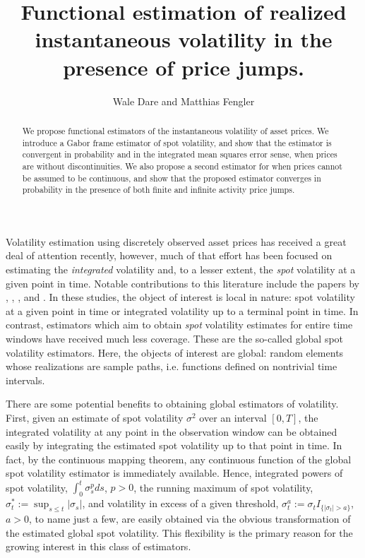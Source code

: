 \documentclass[a4paper, 12pt]{article}
\author{Wale Dare and Matthias Fengler}
\title {Functional estimation of realized instantaneous volatility in the presence of \levy price jumps.}
\renewcommand{\D}{\ensuremath{d}\xspace}
\begin{document}
\maketitle
\begin{abstract}
  We propose functional estimators of the instantaneous volatility of asset prices. We introduce a Gabor frame estimator of spot  volatility, and show that the estimator is convergent  in  probability and  in the integrated mean squares error sense, when prices are without discontinuities. We also propose a  second estimator for when prices cannot be assumed to be continuous,  and show that the proposed estimator converges in probability in the presence of both finite and infinite activity price jumps. 
\end{abstract}
Volatility estimation using discretely observed asset prices has received a great deal of attention recently, however,  much of that effort has been focused on 
estimating the \emph{integrated} volatility and, to a lesser extent, the \emph{spot} volatility at a given point in time. 
Notable contributions to this literature include  the papers by \cite{Foster1996}, \cite{Fan2008},   \cite{Florens1993}, and  \cite{BN2004}.
In these studies, the object of interest is local in nature: spot volatility at a given point in time or integrated volatility up to a terminal point in time. In contrast,  estimators which aim  to obtain  \emph{spot} volatility estimates  for  entire time windows  have received much less coverage. These are the so-called global spot volatility estimators. Here,  the objects of interest are global:   random elements whose realizations are sample paths, i.e. functions defined on  nontrivial time intervals.     

There are some potential benefits to obtaining global estimators of volatility. First, given an estimate of spot volatility $\sigma^2$ over an interval $[0,T]$, the  integrated volatility at any point in the observation window can be obtained easily  by integrating the estimated spot volatility up to that point in time.  In fact, by the continuous mapping theorem, any continuous function of the global spot volatility estimator is immediately available. Hence, integrated powers of spot volatility, $\int^t_0\sigma^p_s \D s$, $p > 0$,  the running maximum of spot volatility, $\sigma^*_t := \sup_{s \le t} \vert \sigma_s \vert$, and volatility in  excess of a given threshold, $\sigma^a_t:=  \sigma_t  I_{\{\vert \sigma_t \vert > a\}}$, $a > 0$,  to name just a few, are easily obtained via  the obvious  transformation of the estimated  global spot volatility.   This flexibility is the primary  reason for the growing interest in this class of estimators.
\end{document}
